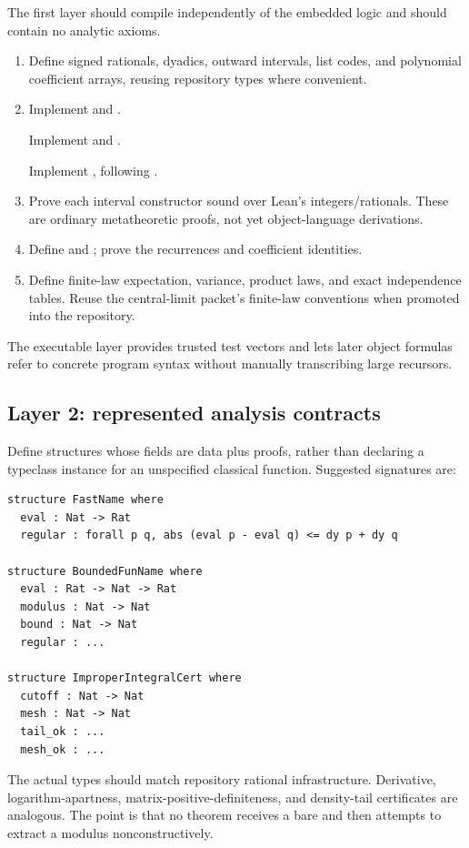 The first layer should compile independently of the embedded logic and should contain no analytic axioms.
\begin{enumerate}[label=\arabic*.]
  \item Define signed rationals, dyadics, outward intervals, list codes, and polynomial coefficient arrays, reusing repository types where convenient.
  \item Implement  and .
  \par Implement  and .
  \par Implement , following
  .
  \item Prove each interval constructor sound over Lean's integers/rationals.  These are ordinary metatheoretic proofs, not yet object-language derivations.
  \item Define  and ; prove the recurrences and coefficient identities.
  \item Define finite-law expectation, variance, product laws, and exact independence tables.  Reuse the central-limit packet's finite-law conventions when promoted into the repository.
\end{enumerate}
The executable layer provides trusted test vectors and lets later object formulas refer to concrete program syntax without manually transcribing large recursors.

\subsection{Layer 2: represented analysis contracts}

Define structures whose fields are data plus proofs, rather than declaring a typeclass instance for an unspecified classical function.  Suggested signatures are:
\begin{lstlisting}[language={}] 
structure FastName where
  eval : Nat -> Rat
  regular : forall p q, abs (eval p - eval q) <= dy p + dy q

structure BoundedFunName where
  eval : Rat -> Nat -> Rat
  modulus : Nat -> Nat
  bound : Nat -> Nat
  regular : ...

structure ImproperIntegralCert where
  cutoff : Nat -> Nat
  mesh : Nat -> Nat
  tail_ok : ...
  mesh_ok : ...
\end{lstlisting}
The actual types should match repository rational infrastructure.  Derivative, logarithm-apartness, matrix-positive-definiteness, and density-tail certificates are analogous.  The point is that no theorem receives a bare  and then attempts to extract a modulus nonconstructively.

